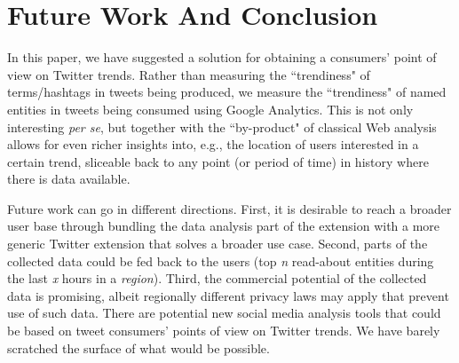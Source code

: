 \documentclass[runningheads,a4paper]{llncs}
\begin{document}

\section{Future Work And Conclusion}\label{sec:conclusion}
In this paper, we have suggested a solution for obtaining a consumers' point of view on Twitter trends. Rather than measuring the ``trendiness" of terms/hashtags in tweets being produced, we measure the ``trendiness" of named entities in tweets being consumed using Google Analytics. This is not only interesting \textit{per se}, but together with the ``by-product" of classical Web analysis allows for even richer insights into, e.g., the location of users interested in a certain trend, sliceable back to any point (or period of time) in history where there is data available.

Future work can go in different directions. First, it is desirable to reach a broader user base through bundling the data analysis part of the extension with a more generic Twitter extension that solves a broader use case. Second, parts of the collected data could be fed back to the users (top \textit{n} read-about entities during the last \textit{x} hours in a \textit{region}). Third, the commercial potential of the collected data is promising, albeit regionally different privacy laws may apply that prevent use of such data. There are potential new social media analysis tools that could be based on tweet consumers' points of view on Twitter trends. We have barely scratched the surface of what would be possible.



\end{document}
